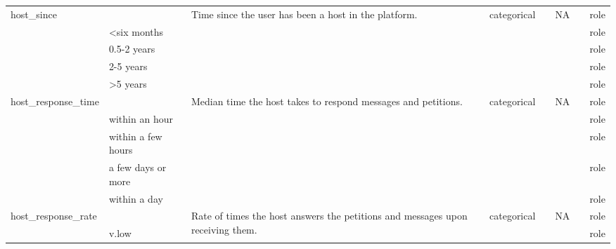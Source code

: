 \begin{center}
\begin{longtable}{@{}llllllll@{}}
host\_since &                             & \multirow{5}{15ex}{Time since the user has been a host in the platform.} & categorical &                & NA                          &         & role \\
                            & \textless{}six months          &                                   &             &                &                             &         & role \\
                            & 0.5-2 years                  &                                   &             &                &                             &         & role \\
                            & 2-5 years                    &                                   &             &                &                             &         & role \\
                            & \textgreater{}5 years        &                                   &             &                &                                      &         & role \\
host\_response\_time        &                             & \multirow{5}{15ex}{Median time the host takes to respond messages and petitions.} & categorical &                & NA                          &         & role \\
                            & within an hour              &                                   &             &                &                             &         & role \\
                            & within a few hours          &                                   &             &                &                             & & role \\
                            & a few days or more          &                                   &             &                &                             &                                  & role \\
                            & within a day                &                                   &             &                &                             &                     & role \\
host\_response\_rate        &                             & \multirow{5}{15ex}{Rate of times the host answers the petitions and messages upon receiving them.} & categorical &                & NA                    &                     & role \\
                            & v.low                       &                                   &             &                &                             &                     & role \\

\end{longtable}
\end{center}

